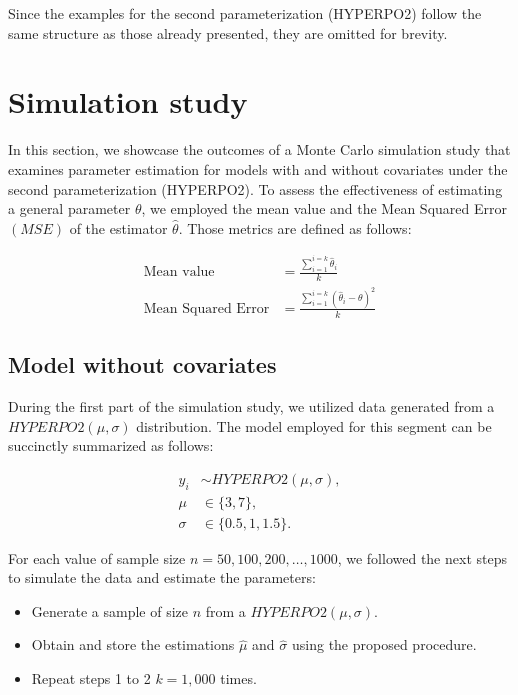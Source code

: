 Since the examples for the second parameterization (HYPERPO2) follow the same structure as those already presented, they are omitted for brevity.

\section{Simulation study}\label{simulation-study}

In this section, we showcase the outcomes of a Monte Carlo simulation study that examines parameter estimation for models with and without covariates under the second parameterization (HYPERPO2). To assess the effectiveness of estimating a general parameter \(\theta\), we employed the mean value and the Mean Squared Error \((MSE)\) of the estimator \(\hat{\theta}\). Those metrics are defined as follows:

\begin{align*} 
    \text{Mean value} &= \frac{\sum_{i=1}^{i=k}{\hat{\theta}_i}}{k}  \\ 
    \text{Mean Squared Error}  &= \frac{\sum_{i=1}^{i=k}{(\hat{\theta}_i - \theta)^2}}{k}
\end{align*}

\subsection{Model without covariates}\label{model-without-covariates}

During the first part of the simulation study, we utilized data generated from a \(HYPERPO2(\mu, \sigma)\) distribution. The model employed for this segment can be succinctly summarized as follows:

\begin{equation}
    \begin{split}
        y_i    &\sim HYPERPO2(\mu, \sigma), \\
        \mu    &\in \{3, 7\}, \\
        \sigma &\in \{0.5, 1, 1.5\}.
    \end{split}
\label{eq:model1}
\end{equation}

For each value of sample size \(n=50, 100, 200, \ldots, 1000\), we followed the next steps to simulate the data and estimate the parameters:

\begin{itemize}
\tightlist
\item
  Generate a sample of size \(n\) from a \(HYPERPO2(\mu, \sigma)\).
\item
  Obtain and store the estimations \(\hat{\mu}\) and \(\hat{\sigma}\) using the proposed procedure.
\item
  Repeat steps 1 to 2 \(k=1,000\) times.
\end{itemize}

